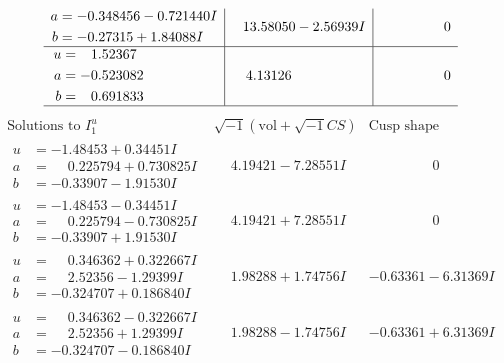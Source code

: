 \documentclass[1p]{elsarticle_modified}
\theoremstyle{definition}
\newcommand{\I}{\sqrt{-1}}
\begin{document}
$$\begin{array}{c|c|c}
\begin{aligned}
a &= -0.348456 - 0.721440 I \\
b &= -0.27315 + 1.84088 I\end{aligned}
 & \phantom{-}13.58050 - 2.56939 I & \phantom{-0.000000 } 0 \\ \hline\begin{aligned}
u &= \phantom{-}1.52367\phantom{ +0.000000I} \\
a &= -0.523082\phantom{ +0.000000I} \\
b &= \phantom{-}0.691833\phantom{ +0.000000I}\end{aligned}
 & \phantom{-}4.13126\phantom{ +0.000000I} & \phantom{-0.000000 } 0\\
 \hline 
 \end{array}$$\newpage$$\begin{array}{c|c|c}  
\text{Solutions to }I^u_{1}& \I (\text{vol} + \sqrt{-1}CS) & \text{Cusp shape}\\
 \hline 
\begin{aligned}
u &= -1.48453 + 0.34451 I \\
a &= \phantom{-}0.225794 + 0.730825 I \\
b &= -0.33907 - 1.91530 I\end{aligned}
 & \phantom{-}4.19421 - 7.28551 I & \phantom{-0.000000 } 0 \\ \hline\begin{aligned}
u &= -1.48453 - 0.34451 I \\
a &= \phantom{-}0.225794 - 0.730825 I \\
b &= -0.33907 + 1.91530 I\end{aligned}
 & \phantom{-}4.19421 + 7.28551 I & \phantom{-0.000000 } 0 \\ \hline\begin{aligned}
u &= \phantom{-}0.346362 + 0.322667 I \\
a &= \phantom{-}2.52356 - 1.29399 I \\
b &= -0.324707 + 0.186840 I\end{aligned}
 & \phantom{-}1.98288 + 1.74756 I & -0.63361 - 6.31369 I \\ \hline\begin{aligned}
u &= \phantom{-}0.346362 - 0.322667 I \\
a &= \phantom{-}2.52356 + 1.29399 I \\
b &= -0.324707 - 0.186840 I\end{aligned}
 & \phantom{-}1.98288 - 1.74756 I & -0.63361 + 6.31369 I \\ \hline\begin{aligned}

\end{aligned}
\end{array}$$
\end{document}
